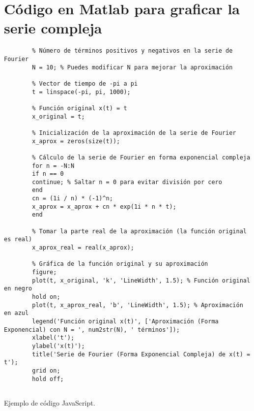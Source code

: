 \section{Código en Matlab para graficar la serie compleja}\label{app2:complex-code-matlab}
\begin{longlisting}
	\begin{verbatim}
		% Número de términos positivos y negativos en la serie de Fourier
		N = 10; % Puedes modificar N para mejorar la aproximación
		
		% Vector de tiempo de -pi a pi
		t = linspace(-pi, pi, 1000);
		
		% Función original x(t) = t
		x_original = t;
		
		% Inicialización de la aproximación de la serie de Fourier
		x_aprox = zeros(size(t));
		
		% Cálculo de la serie de Fourier en forma exponencial compleja
		for n = -N:N
		if n == 0
		continue; % Saltar n = 0 para evitar división por cero
		end
		cn = (1i / n) * (-1)^n;
		x_aprox = x_aprox + cn * exp(1i * n * t);
		end
		
		% Tomar la parte real de la aproximación (la función original es real)
		x_aprox_real = real(x_aprox);
		
		% Gráfica de la función original y su aproximación
		figure;
		plot(t, x_original, 'k', 'LineWidth', 1.5); % Función original en negro
		hold on;
		plot(t, x_aprox_real, 'b', 'LineWidth', 1.5); % Aproximación en azul
		legend('Función original x(t)', ['Aproximación (Forma Exponencial) con N = ', num2str(N), ' términos']);
		xlabel('t');
		ylabel('x(t)');
		title('Serie de Fourier (Forma Exponencial Compleja) de x(t) = t');
		grid on;
		hold off;
		
	\end{verbatim}
	\caption{Ejemplo de código JavaScript.}
\end{longlisting}